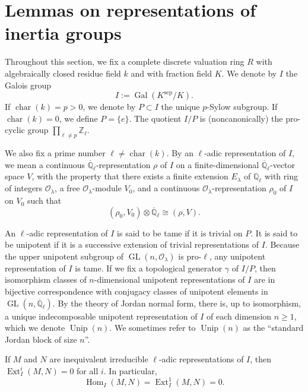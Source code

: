 \section{Lemmas on representations of inertia groups}\label{sec:3.1}

Throughout this section, we fix a complete discrete valuation ring \(R\) with
algebraically closed residue field \(k\) and with fraction field \(K\). We
denote by \(I\) the Galois group
\[
  I:=\operatorname{Gal}(K^{\mathrm{sep}}/K).
\]
If \(\operatorname{char}(k)=p>0\), we denote by \(P\subset I\) the unique
\(p\)-Sylow subgroup. If \(\operatorname{char}(k)=0\), we define
\(P=\{e\}\). The quotient \(I/P\) is (noncanonically) the pro-cyclic group
\(\prod_{\ell\ne p}\mathbb{Z}_{\ell}\).

We also fix a prime number \(\ell\ne\operatorname{char}(k)\). By an
\(\ell\)-adic representation of \(I\), we mean a continuous
\(\overline{\mathbb{Q}}_\ell\)-representation \(\rho\) of \(I\) on a
finite-dimensional \(\overline{\mathbb{Q}}_\ell\)-vector space \(V\), with
the property that there exists a finite extension \(E_\lambda\) of
\(\mathbb{Q}_\ell\) with ring of integers \(\mathcal{O}_\lambda\), a free
\(\mathcal{O}_\lambda\)-module \(V_0\), and a continuous
\(\mathcal{O}_\lambda\)-representation \(\rho_0\) of \(I\) on \(V_0\) such
that
\[
  (\rho_0,V_0)\otimes\overline{\mathbb{Q}}_\ell\cong(\rho,V).
\]

An \(\ell\)-adic representation of \(I\) is said to be tame if it is trivial
on \(P\). It is said to be unipotent if it is a successive extension of
trivial representations of \(I\). Because the upper unipotent subgroup of
\(\operatorname{GL}(n,\mathcal{O}_\lambda)\) is pro-\(\ell\), any unipotent
representation of \(I\) is tame. If we fix a topological generator \(\gamma\)
of \(I/P\), then isomorphism classes of \(n\)-dimensional unipotent
representations of \(I\) are in bijective correspondence with conjugacy
classes of unipotent elements in
\(\operatorname{GL}(n,\overline{\mathbb{Q}}_\ell)\). By the theory of Jordan
normal form, there is, up to isomorphism, a unique indecomposable unipotent
representation of \(I\) of each dimension \(n\geq 1\), which we denote
\(\operatorname{Unip}(n)\). We sometimes refer to \(\operatorname{Unip}(n)\)
as the ``standard Jordan block of size \(n\)''.

If \(M\) and \(N\) are inequivalent irreducible \(\ell\)-adic representations
of \(I\), then \(\operatorname{Ext}^i_I(M,N)=0\) for all \(i\). In particular,
\[
  \operatorname{Hom}_I(M,N)=\operatorname{Ext}^1_I(M,N)=0.
\]

